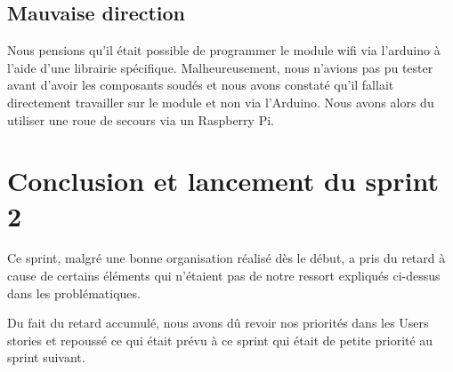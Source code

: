 \subsection{Mauvaise direction} 
Nous pensions qu'il était possible de programmer le module wifi via l'arduino à l'aide d'une librairie spécifique. Malheureusement, nous n'avions pas pu tester avant d'avoir les composants soudés et nous avons constaté qu'il fallait directement travailler sur le module et non via l'Arduino. Nous avons alors du utiliser une roue de secours via un Raspberry Pi. 
 

\section{Conclusion et lancement du sprint 2}

Ce sprint, malgré une bonne organisation réalisé dès le début, a pris du retard à cause de certains éléments qui n'étaient pas de notre ressort expliqués ci-dessus dans les problématiques. 

Du fait du retard accumulé, nous avons dû revoir nos priorités dans les Users stories et repoussé ce qui était prévu à ce sprint qui était de petite priorité au sprint suivant. 





	
